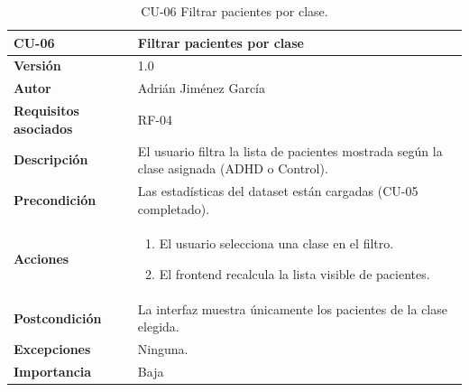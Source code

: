 \begin{table}[p]
	\centering
	\begin{tabularx}{\linewidth}{ p{} X }
		\toprule
		\textbf{CU-06}    & \textbf{Filtrar pacientes por clase}\\
		\toprule
		\textbf{Versión}              & 1.0 \\
		\textbf{Autor}                & Adrián Jiménez García \\
		\textbf{Requisitos asociados} & RF-04 \\
		\textbf{Descripción}          & El usuario filtra la lista de pacientes mostrada según la clase asignada (ADHD o Control). \\
		\textbf{Precondición}         & Las estadísticas del dataset están cargadas (CU-05 completado). \\
		\textbf{Acciones}             &
		\begin{enumerate}
			\def\labelenumi{\arabic{enumi}.}
			\tightlist
			\item El usuario selecciona una clase en el filtro.
			\item El frontend recalcula la lista visible de pacientes.
		\end{enumerate}\\
		\textbf{Postcondición}        & La interfaz muestra únicamente los pacientes de la clase elegida. \\
		\textbf{Excepciones}          & Ninguna. \\
		\textbf{Importancia}          & Baja \\
		\bottomrule
	\end{tabularx}
	\caption{CU-06 Filtrar pacientes por clase.}
\end{table}

